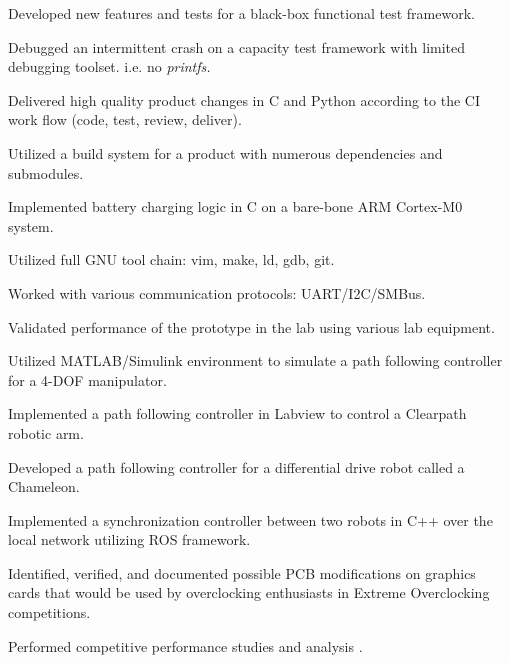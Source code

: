 \documentclass[]{deedy-resume-openfont}
\begin{document}
\begin{tightemize}
\item Developed new features and tests for a black-box functional test framework.
\item Debugged an intermittent crash on a capacity test framework with limited debugging toolset. i.e. no \it{printfs}.
\item Delivered high quality product changes in C and Python according to the CI work flow (code, test, review, deliver).
\item Utilized a build system for a product with numerous dependencies and submodules.
\end{tightemize}
\sectionsep

\begin{tightemize}
\item Implemented battery charging logic in C on a bare-bone ARM Cortex-M0 system.
\item Utilized full GNU tool chain: vim, make, ld, gdb, git.
\item Worked with various communication protocols: UART/I2C/SMBus.
\item Validated performance of the prototype in the lab using various lab equipment.
\end{tightemize}
\sectionsep

\begin{tightemize}
\item Utilized MATLAB/Simulink environment to simulate a path following controller for a 4-DOF manipulator.
\item Implemented a path following controller in Labview to control a Clearpath robotic arm.
\item Developed a path following controller for a differential drive robot called a Chameleon.
\item Implemented a synchronization controller between two robots in C++ over the local network utilizing ROS framework.
\end{tightemize}
\sectionsep

\begin{tightemize}
\item Identified, verified, and documented possible PCB modifications on graphics cards that would be used by overclocking enthusiasts in Extreme Overclocking competitions.
\item Performed competitive performance studies and analysis .
\end{tightemize}
\sectionsep
\end{document}
